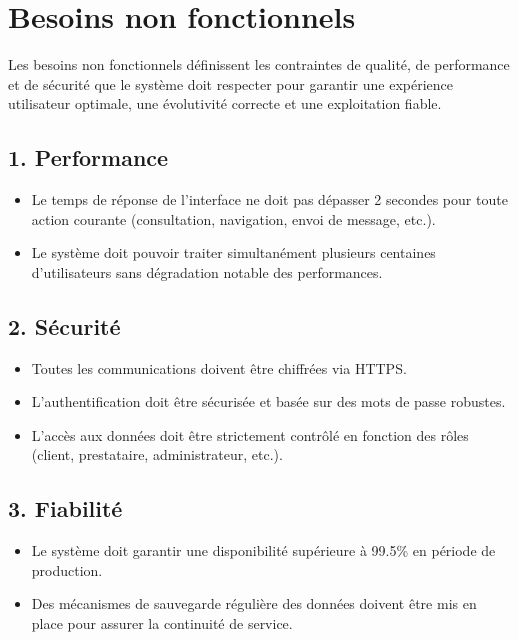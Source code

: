 \section{Besoins non fonctionnels}

Les besoins non fonctionnels définissent les contraintes de qualité, de performance et de sécurité que le système doit respecter pour garantir une expérience utilisateur optimale, une évolutivité correcte et une exploitation fiable.

\subsection*{1. Performance}
\begin{itemize}
    \item Le temps de réponse de l’interface ne doit pas dépasser 2 secondes pour toute action courante (consultation, navigation, envoi de message, etc.).
    \item Le système doit pouvoir traiter simultanément plusieurs centaines d’utilisateurs sans dégradation notable des performances.
\end{itemize}

\subsection*{2. Sécurité}
\begin{itemize}
    \item Toutes les communications doivent être chiffrées via HTTPS.
    \item L’authentification doit être sécurisée et basée sur des mots de passe robustes.
    \item L’accès aux données doit être strictement contrôlé en fonction des rôles (client, prestataire, administrateur, etc.).

\end{itemize}

\subsection*{3. Fiabilité}
\begin{itemize}
    \item Le système doit garantir une disponibilité supérieure à 99.5\% en période de production.
    \item Des mécanismes de sauvegarde régulière des données doivent être mis en place pour assurer la continuité de service.
\end{itemize}

